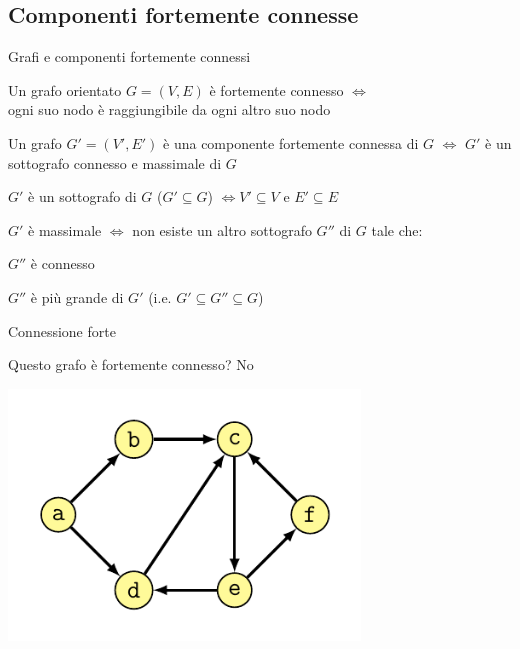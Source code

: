 \subsection{Componenti fortemente connesse}




\begin{frame}{Grafi e componenti fortemente connessi}

\vspace{-6pt}
\begin{myboxtitle}[Definizioni]
\BIL
\item Un grafo orientato $G=(V,E)$ è \alert{fortemente connesso} $\Leftrightarrow$\\ ogni
suo nodo è raggiungibile da ogni altro suo nodo
\item Un grafo $G'=(V',E')$ è una \alert{componente fortemente connessa} di $G$ $\Leftrightarrow$ $G'$ è un sottografo connesso e massimale di $G$
\EIL
\end{myboxtitle}

\begin{myboxtitle}
\BIL
\item $G'$ è un \alert{sottografo} di $G$ ($G' \subseteq G$) $\Leftrightarrow V' \subseteq V$ e $E' \subseteq E$
\item $G'$ è \alert{massimale} $\Leftrightarrow$ non esiste un altro sottografo $G''$ di $G$ tale che:
\BI
\item $G''$ è connesso 
\item $G''$ è più grande di $G'$ (i.e. $G' \subseteq G'' \subseteq G$)
\EI
\EIL
\end{myboxtitle}

\end{frame}

\begin{frame}{Connessione forte}

\vspace{-6pt}
\begin{myboxtitle}[Domanda]
Questo grafo è fortemente connesso? \pause \alert{No}
\end{myboxtitle}

\begin{overprint}
\centering\includegraphics[width=0.70\textwidth,page=1]{scc.pdf}
\end{overprint}

\end{frame}

